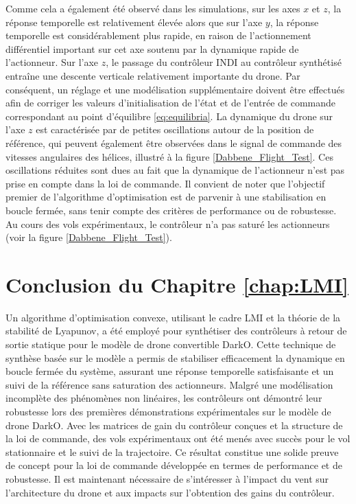 Comme cela a également été observé dans les simulations, sur les axes $x$ et $z$, la réponse temporelle est relativement élevée alors que sur l'axe $y$, la réponse temporelle est considérablement plus rapide, en raison de l'actionnement différentiel important sur cet axe soutenu par la dynamique rapide de l'actionneur. Sur l'axe $z$, le passage du contrôleur INDI au contrôleur synthétisé entraîne une descente verticale relativement importante du drone. Par conséquent, un réglage et une modélisation supplémentaire doivent être effectués afin de corriger les valeurs d'initialisation de l'état et de l'entrée de commande correspondant au point d'équilibre \eqref{eq:equilibria}. La dynamique du drone sur l'axe $z$ est caractérisée par de petites oscillations autour de la position de référence, qui peuvent également être observées dans le signal de commande des vitesses angulaires des hélices, illustré à la figure \ref{Dabbene_Flight_Test}. Ces oscillations réduites sont dues au fait que la dynamique de l'actionneur n'est pas prise en compte dans la loi de commande. Il convient de noter que l'objectif premier de l'algorithme d'optimisation est de parvenir à une stabilisation en boucle fermée, sans tenir compte des critères de performance ou de robustesse. Au cours des vols expérimentaux, le contrôleur n'a pas saturé les actionneurs (voir la figure \ref{Dabbene_Flight_Test}).



\section{Conclusion du Chapitre \ref{chap:LMI}}

Un algorithme d'optimisation convexe, utilisant le cadre LMI et la théorie de la stabilité de Lyapunov, a été employé pour synthétiser des contrôleurs à retour de sortie statique pour le modèle de drone convertible DarkO. Cette technique de synthèse basée sur le modèle a permis de stabiliser efficacement la dynamique en boucle fermée du système, assurant une réponse temporelle satisfaisante et un suivi de la référence sans saturation des actionneurs. Malgré une modélisation incomplète des phénomènes non linéaires, les contrôleurs ont démontré leur robustesse lors des premières démonstrations expérimentales sur le modèle de drone DarkO. Avec les matrices de gain du contrôleur conçues et la structure de la loi de commande, des vols expérimentaux ont été menés avec succès pour le vol stationnaire et le suivi de la trajectoire. Ce résultat constitue une solide preuve de concept pour la loi de commande développée en termes de performance et de robustesse.
Il est maintenant nécessaire de s'intéresser à l'impact du vent sur l'architecture du drone et aux impacts sur l'obtention des gains du contrôleur.
